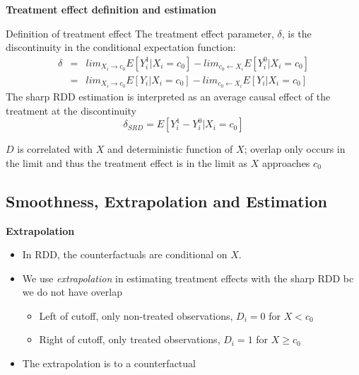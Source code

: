 \documentclass[notes=show]{beamer}
\begin{document}
\begin{frame}[plain]
	\begin{center}
	\textbf{Treatment effect definition and estimation}
	\end{center}
	
	\begin{block}{Definition of treatment effect}
	The treatment effect parameter, $\delta$, is the discontinuity in the conditional expectation function:
		\begin{eqnarray*}
		\delta&=&lim_{X_i\rightarrow{c_0}}E[Y^1_i|X_i=c_0] - lim_{c_0\leftarrow{X_i}}E[Y^0_i | X_i=c_0] \\
			&=&lim_{X_i\rightarrow{c_0}}E[Y_i|X_i=c_0] - lim_{c_0\leftarrow{X_i}}E[Y_i | X_i=c_0]
		\end{eqnarray*}The sharp RDD estimation is interpreted as an average causal effect of the treatment at the discontinuity$$\delta_{SRD}=E[Y^1_i - Y_i^0 | X_i=c_0]$$
	\end{block}
	$D$ is correlated with $X$ and deterministic function of $X$; overlap only occurs in the limit and thus the treatment effect is in the limit as $X$ approaches $c_0$
\end{frame}





\subsection{Smoothness, Extrapolation and Estimation}

\begin{frame}

	\begin{center}
	\textbf{Extrapolation}
	\end{center}
	
	\begin{itemize}
	\item In RDD, the counterfactuals are conditional on $X$.  
	\item We use \emph{extrapolation} in estimating treatment effects with the sharp RDD bc we do not have overlap
		\begin{itemize}
		\item Left of cutoff, only non-treated observations, $D_i=0$ for $X<c_0$
		\item Right of cutoff, only treated observations, $D_i=1$ for $X\geq c_0$
		\end{itemize}
	\item The extrapolation is to a counterfactual
	
	\end{itemize}

\end{frame}
\end{document}
